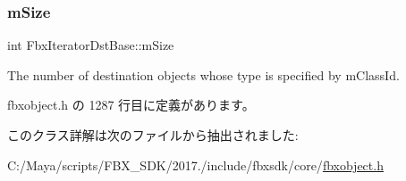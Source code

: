 \subsubsection{\texorpdfstring{m\+Size}{mSize}}
{\footnotesize\ttfamily int Fbx\+Iterator\+Dst\+Base\+::m\+Size\hspace{0.3cm}{\ttfamily [protected]}}

The number of destination objects whose type is specified by m\+Class\+Id. 

 fbxobject.\+h の 1287 行目に定義があります。



このクラス詳解は次のファイルから抽出されました\+:\begin{DoxyCompactItemize}
\item 
C\+:/\+Maya/scripts/\+F\+B\+X\+\_\+\+S\+D\+K/2017./include/fbxsdk/core/\hyperlink{fbxobject_8h}{fbxobject.\+h}\end{DoxyCompactItemize}
